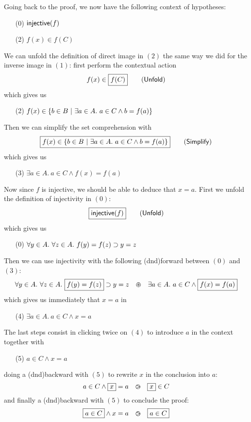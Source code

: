 Going back to the proof, we now have the following context of hypotheses:
\begin{itemize}
  \item[(0)] $\mbox{\textsf{injective}}(f)$
  \item[(2)] $f(x) \in f(C)$
\end{itemize}
We can unfold the definition of direct image in $(2)$ the same way we did for
the inverse image in $(1)$: first perform the contextual action
$$f(x) \in \fbox{$f(C)$} \qquad \text{(\textsf{Unfold})}$$
which gives us
\begin{itemize}
  \item[(2)] $f(x) \in \left\{b \in B ~\middle|~ \exists a \in A.\ a \in C \land b = f(a)\right\}$
\end{itemize}
Then we can simplify the set comprehension with
$$\fbox{$f(x) \in \left\{b \in B ~\middle|~ \exists a \in A.\ a \in C \land b = f(a)\right\}$} \qquad \text{(\textsf{Simplify})}$$
which gives us
\begin{itemize}
  \item[(3)] $\exists a \in A.\ a \in C \land f(x) = f(a)$
\end{itemize}
Now since $f$ is injective, we should be able to deduce that $x = a$. First we
unfold the definition of injectivity in $(0)$:
$$\fbox{$\mbox{\textsf{injective}}(f)$} \qquad \text{(\textsf{Unfold})}$$
which gives us
\begin{itemize}
  \item[(0)] $\forall y \in A.\ \forall z \in A.\ f(y) = f(z) \supset y = z$
\end{itemize}
Then we can use injectivity with the following \kl(dnd){forward}  between $(0)$ and
$(3)$:
$$\forall y \in A.\ \forall z \in A.\ \select{f(y) = f(z)} \limp y = z ~~\forw~~ \exists a \in A.\ a \in C \land \select{f(x) = f(a)}$$
which gives us immediately that $x = a$ in
\begin{itemize}
  \item[(4)] $\exists a \in A.\ a \in C \land x = a$
\end{itemize}
The last steps consist in clicking twice on $(4)$ to introduce $a$ in the
context together with
\begin{itemize}
  \item[(5)] $a \in C \land x = a$
\end{itemize}
doing a \kl(dnd){backward}  with $(5)$ to rewrite $x$ in the conclusion
into $a$:
$$a \in C \land \fbox{$x$} = a ~~\operatorname{\,\varogreaterthan\,}~~ \fbox{$x$} \in C$$ and finally a
\kl(dnd){backward}  with $(5)$ to conclude the proof:
$$\fbox{$a \in C$} \land x = a ~~\operatorname{\,\varogreaterthan\,}~~ \fbox{$a \in C$}$$

